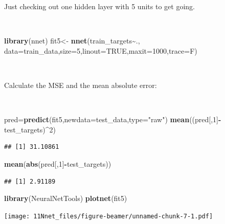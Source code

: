 \documentclass[
  10pt,
  ignorenonframetext,
]{beamer}
\newenvironment{Shaded}{\begin{snugshade}}{\end{snugshade}}
\newcommand{\AttributeTok}[1]{\textcolor[rgb]{0.13,0.29,0.53}{#1}}
\newcommand{\ConstantTok}[1]{\textcolor[rgb]{0.56,0.35,0.01}{#1}}
\newcommand{\DecValTok}[1]{\textcolor[rgb]{0.00,0.00,0.81}{#1}}
\newcommand{\FunctionTok}[1]{\textcolor[rgb]{0.13,0.29,0.53}{\textbf{#1}}}
\newcommand{\NormalTok}[1]{#1}
\newcommand{\OtherTok}[1]{\textcolor[rgb]{0.56,0.35,0.01}{#1}}
\newcommand{\SpecialCharTok}[1]{\textcolor[rgb]{0.81,0.36,0.00}{\textbf{#1}}}
\newcommand{\StringTok}[1]{\textcolor[rgb]{0.31,0.60,0.02}{#1}}
\begin{document}
\begin{frame}[fragile]
Just checking out one hidden layer with 5 units to get going.

\(~\)

\scriptsize

\begin{Shaded}
\begin{Highlighting}[]
\FunctionTok{library}\NormalTok{(nnet)}
\NormalTok{fit5}\OtherTok{\textless{}{-}} \FunctionTok{nnet}\NormalTok{(train\_targets}\SpecialCharTok{\textasciitilde{}}\NormalTok{., }\AttributeTok{data=}\NormalTok{train\_data,}\AttributeTok{size=}\DecValTok{5}\NormalTok{,}\AttributeTok{linout=}\ConstantTok{TRUE}\NormalTok{,}\AttributeTok{maxit=}\DecValTok{1000}\NormalTok{,}\AttributeTok{trace=}\NormalTok{F)}
\end{Highlighting}
\end{Shaded}

\(~\)

\normalsize

Calculate the MSE and the mean absolute error:

\(~\) \scriptsize

\begin{Shaded}
\begin{Highlighting}[]
\NormalTok{pred}\OtherTok{=}\FunctionTok{predict}\NormalTok{(fit5,}\AttributeTok{newdata=}\NormalTok{test\_data,}\AttributeTok{type=}\StringTok{"raw"}\NormalTok{)}
\FunctionTok{mean}\NormalTok{((pred[,}\DecValTok{1}\NormalTok{]}\SpecialCharTok{{-}}\NormalTok{test\_targets)}\SpecialCharTok{\^{}}\DecValTok{2}\NormalTok{)}
\end{Highlighting}
\end{Shaded}

\begin{verbatim}
## [1] 31.10861
\end{verbatim}

\begin{Shaded}
\begin{Highlighting}[]
\FunctionTok{mean}\NormalTok{(}\FunctionTok{abs}\NormalTok{(pred[,}\DecValTok{1}\NormalTok{]}\SpecialCharTok{{-}}\NormalTok{test\_targets))}
\end{Highlighting}
\end{Shaded}

\begin{verbatim}
## [1] 2.91189
\end{verbatim}
\end{frame}

\begin{frame}[fragile]
\begin{Shaded}
\begin{Highlighting}[]
\FunctionTok{library}\NormalTok{(NeuralNetTools)}
\FunctionTok{plotnet}\NormalTok{(fit5)}
\end{Highlighting}
\end{Shaded}

\texttt{[image: 11Nnet\_files/figure-beamer/unnamed-chunk-7-1.pdf]}
\end{frame}
\end{document}
